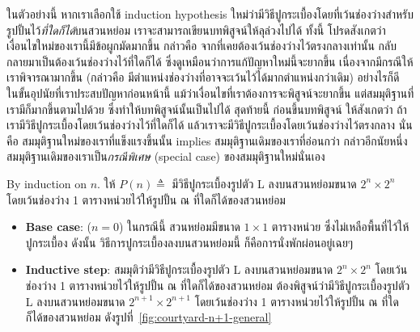 \begin{theorem}
ในตัวอย่างนี้ หากเราเลือกใช้ induction hypothesis ใหม่ว่ามีวิธีปูกระเบื้องโดยที่เว้นช่องว่างสำหรับรูปปั้นไว้\emph{ที่ใดก็ได้}บนสวนหย่อม เราจะสามารถเขียนบทพิสูจน์ให้ลุล่วงไปได้ \enskip ทั้งนี้ โปรดสังเกตว่า เงื่อนไขใหม่ของเรานี้มีข้อผูกมัดมากขึ้น กล่าวคือ จากที่เคยต้องเว้นช่องว่างไว้ตรงกลางเท่านั้น กลับกลายมาเป็นต้องเว้นช่องว่างไว้ที่ใดก็ได้ ซึ่งดูเหมือนว่าการแก้ปัญหาใหม่นี้จะยากขึ้น เนื่องจากมีกรณีให้เราพิจารณามากขึ้น (กล่าวคือ มีตำแหน่งช่องว่างที่อาจจะเว้นไว้ได้มากตำแหน่งกว่าเดิม) \enskip อย่างไรก็ดี ในขั้นอุปนัยที่เราประสบปัญหาก่อนหน้านี้ แม้ว่าเงื่อนไขที่เราต้องการจะพิสูจน์จะยากขึ้น แต่สมมุติฐานที่เรามีก็มากขึ้นตามไปด้วย ซึ่งทำให้บทพิสูจน์นั้นเป็นไปได้ \enskip สุดท้ายนี้ ก่อนขึ้นบทพิสูจน์ ให้สังเกตว่า ถ้าเรามีวิธีปูกระเบื้องโดยเว้นช่องว่างไว้ที่ใดก็ได้ แล้วเราจะมีวิธีปูกระเบื้องโดยเว้นช่องว่างไว้ตรงกลาง นั่นคือ สมมุติฐานใหม่ของเราที่แข็งแรงขึ้นนั้น implies สมมุติฐานเดิมของเราที่อ่อนกว่า \enskip กล่าวอีกนัยหนึ่ง สมมุติฐานเดิมของเราเป็น\emph{กรณีพิเศษ} (special case) ของสมมุติฐานใหม่นั่นเอง
%
\begin{pf}
By induction on $n$.  ให้ $P(n)\triangleq$ มีวิธีปูกระเบื้องรูปตัว L ลงบนสวนหย่อมขนาด $2^n\times 2^n$ โดยเว้นช่องว่าง 1 ตารางหน่วยไว้ให้รูปปั้น ณ ที่ใดก็ได้ของสวนหย่อม
\begin{itemize}
\item {\bf Base case}: ($n=0$) \quad ในกรณีนี้ สวนหย่อมมีขนาด $1\times 1$ ตารางหน่วย ซึ่งไม่เหลือพื้นที่ไว้ให้ปูกระเบื้อง ดังนั้น วิธีการปูกระเบื้องลงบนสวนหย่อมนี้ ก็คือการนั่งพักผ่อนอยู่เฉยๆ \quad\yea
\item {\bf Inductive step}: สมมุติว่ามีวิธีปูกระเบื้องรูปตัว L ลงบนสวนหย่อมขนาด $2^n\times 2^n$ โดยเว้นช่องว่าง 1 ตารางหน่วยไว้ให้รูปปั้น ณ ที่ใดก็ได้ของสวนหย่อม ต้องพิสูจน์ว่ามีวิธีปูกระเบื้องรูปตัว L ลงบนสวนหย่อมขนาด $2^{n+1}\times 2^{n+1}$ โดยเว้นช่องว่าง 1 ตารางหน่วยไว้ให้รูปปั้น ณ ที่ใดก็ได้ของสวนหย่อม ดังรูปที่~\ref{fig:courtyard-n+1-general}
%
\begin{figure}
\centering
{}
\end{figure}
\end{itemize}
\end{pf}
\end{theorem}
